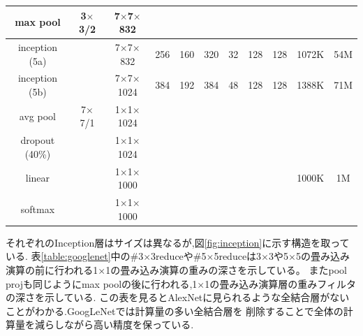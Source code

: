 {\begin{table}[p]
\begin{center}
{\begin{tabular}{|c|c|c|c|c|c|c|c|c|c|c|}
  max pool       & 3$\times$3/2 & 7$\times$7$\times$832 &  &  &  &  &  &  &  &  \\ \hline
  inception (5a) &  & 7$\times$7$\times$832 & 256 & 160 & 320 & 32 & 128 & 128 & 1072K & 54M \\ \hline
  inception (5b) &  & 7$\times$7$\times$1024 & 384 & 192 & 384 & 48 & 128 & 128 & 1388K & 71M \\ \hline
  avg pool       & 7$\times$7/1 & 1$\times$1$\times$1024 &  &  &  &  &  &  &  &  \\ \hline
  dropout (40\%) &  & 1$\times$1$\times$1024 &  &  &  &  &  &  &  &  \\ \hline
  linear         &  & 1$\times$1$\times$1000 &  &  &  &  &  &  & 1000K & 1M \\ \hline
  softmax        &  & 1$\times$1$\times$1000 &  &  &  &  &  &  &  &  \\ \hline
  \end{tabular}
  }
  \end{center}
\end{table}

それぞれのInception層はサイズは異なるが,図\ref{fig:inception}に示す構造を取っている.
表\ref{table:googlenet}中の\#3$\times$3reduceや\#5$\times$5reduceは3$\times$3や5$\times$5の畳み込み演算の前に行われる1$\times$1の畳み込み演算の重みの深さを示している。
またpool projも同じようにmax poolの後に行われる,1$\times$1の畳み込み演算層の重みフィルタの深さを示している.
この表を見るとAlexNetに見られるような全結合層がないことがわかる.GoogLeNetでは計算量の多い全結合層を
削除することで全体の計算量を減らしながら高い精度を保っている.
}
